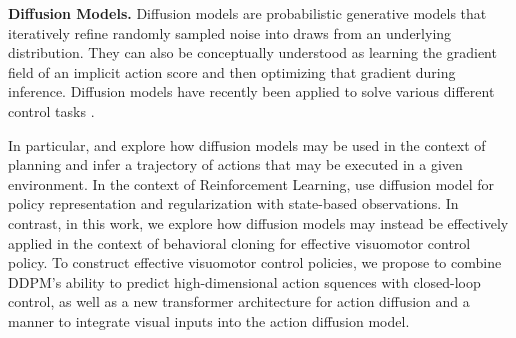 \documentclass[Afour,sageh,times]{sagej}
\newcommand{\cmark}{\textcolor{green}{\ding{51}}}%
\newcommand{\xmark}{\textcolor{red}{\ding{55}}}%
\begin{document}



\textbf{Diffusion Models.}
Diffusion models are probabilistic generative models that iteratively refine randomly sampled noise into draws from an underlying distribution. They can also be conceptually understood as learning the gradient field of an implicit action score and then optimizing that gradient during inference.
Diffusion models \citep{sohldickstein2015nonequilibrium, ho2020denoising} have recently been applied to solve various different control tasks \citep{janner2022diffuser, urain2022se, ajay2022conditional}.

In particular, \citet{janner2022diffuser} and \citet{huang2023diffusion} explore how diffusion models may be  used in the context of planning and infer a trajectory of actions that may be executed in a given environment. 
In the context of Reinforcement Learning, \citet{wang2022diffusion} use diffusion model for policy representation and regularization with state-based observations.
In contrast, in this work, we explore how diffusion models may instead be effectively applied in the context of behavioral cloning for effective visuomotor control policy. 
To construct effective visuomotor control policies, we propose to combine DDPM's ability to predict high-dimensional action squences with closed-loop control, as well as a new transformer architecture for action diffusion and a manner to integrate visual inputs into the action diffusion model.
\end{document}

